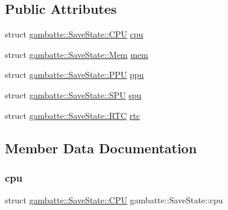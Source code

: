 \subsection*{Public Attributes}
\begin{DoxyCompactItemize}
\item 
struct \hyperlink{structgambatte_1_1SaveState_1_1CPU}{gambatte\+::\+Save\+State\+::\+C\+PU} \hyperlink{structgambatte_1_1SaveState_a6aed8b073aa20c0cd3b435994491df52}{cpu}
\item 
struct \hyperlink{structgambatte_1_1SaveState_1_1Mem}{gambatte\+::\+Save\+State\+::\+Mem} \hyperlink{structgambatte_1_1SaveState_a9ba524e9ca950531ef016734c2fc2532}{mem}
\item 
struct \hyperlink{structgambatte_1_1SaveState_1_1PPU}{gambatte\+::\+Save\+State\+::\+P\+PU} \hyperlink{structgambatte_1_1SaveState_a470cf7452cdd426d479cd337e1af1fea}{ppu}
\item 
struct \hyperlink{structgambatte_1_1SaveState_1_1SPU}{gambatte\+::\+Save\+State\+::\+S\+PU} \hyperlink{structgambatte_1_1SaveState_a0cd87c59e350952e3e12d3d2c1399d0f}{spu}
\item 
struct \hyperlink{structgambatte_1_1SaveState_1_1RTC}{gambatte\+::\+Save\+State\+::\+R\+TC} \hyperlink{structgambatte_1_1SaveState_ae9dd999c313ced5717f389cf3565556a}{rtc}
\end{DoxyCompactItemize}


\subsection{Member Data Documentation}
\mbox{\label{structgambatte_1_1SaveState_a6aed8b073aa20c0cd3b435994491df52}} 
\subsubsection{\texorpdfstring{cpu}{cpu}}
{\footnotesize\ttfamily struct \hyperlink{structgambatte_1_1SaveState_1_1CPU}{gambatte\+::\+Save\+State\+::\+C\+PU}  gambatte\+::\+Save\+State\+::cpu}

\mbox{\label{structgambatte_1_1SaveState_a9ba524e9ca950531ef016734c2fc2532}} 
